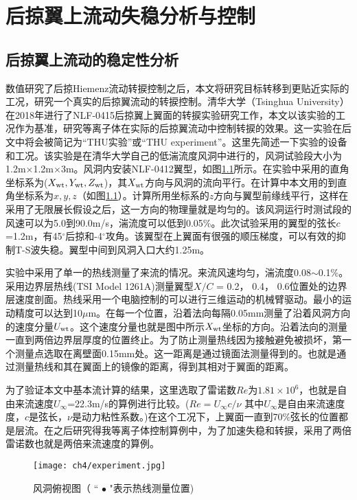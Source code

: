 \chapter{后掠翼上流动失稳分析与控制}
\section{后掠翼上流动的稳定性分析}
数值研究了后掠Hiemenz流动转捩控制之后，本文将研究目标转移到更贴近实际的工况，研究一个真实的后掠翼流动的转捩控制。清华大学（Tsinghua University）在2018年进行了NLF-0415后掠翼上翼面的转捩实验研究工作\cite{wang2018}，本文以该实验的工况作为基准，研究等离子体在实际的后掠翼流动中控制转捩的效果。这一实验在后文中将会被简记为``THU实验''或``THU experiment''。这里先简述一下实验的设备和工况。该实验是在清华大学自己的低湍流度风洞中进行的，风洞试验段大小为1.2m$\times$1.2m$\times$3m。风洞内安装NLF-0412翼型，如图\ref{f:experiment}所示。在实验中采用的直角坐标系为($X_{\rm wt},Y_{\rm wt},Z_{\rm wt}$)，其$X_{\rm wt}$方向与风洞的流向平行。在计算中本文用的到直角坐标系为$x,y,z$（如图\ref{f:experiment}）。计算所用坐标系的$z$方向与翼型前缘线平行，这样在采用了无限展长假设之后，这一方向的物理量就是均匀的。该风洞运行时测试段的风速可以为5.0到90.0m/s，湍流度可以低到0.05\%。此次试验采用的翼型的弦长$c$=1.2m，有45$^\circ$后掠和-4$^\circ$攻角。该翼型在上翼面有很强的顺压梯度，可以有效的抑制T-S波失稳\cite{Dagenhart1999}。翼型中间到风洞入口大约1.25m。

实验中采用了单一的热线测量了来流的情况。来流风速均匀，湍流度0.08$\sim$0.1\%。采用边界层热线(TSI Model 1261A)测量翼型$X/C$ = 0.2， 0.4， 0.6位置处的边界层速度剖面。热线采用一个电脑控制的可以进行三维运动的机械臂驱动。最小的运动精度可以达到10$\mu$m。在每一个位置，沿着法向每隔0.05mm测量了沿着风洞方向的速度分量$U_{\rm wt}$。这个速度分量也就是图中所示$X_{\rm wt}$坐标的方向。沿着法向的测量一直到两倍边界层厚度的位置终止。为了防止测量热线因为接触避免被损坏，第一个测量点选取在离壁面0.15mm处。这一距离是通过镜面法测量得到的。也就是通过测量热线和其在翼面上的镜像的距离，得到其相对于翼面的距离。

为了验证本文中基本流计算的结果，这里选取了雷诺数$Re$为$1.81\times10^6$，也就是自由来流速度$U_\infty$=22.3m/s的算例进行比较。($Re={U_\infty c}/{\nu}$ 其中$U_\infty$是自由来流速度度，$c$是弦长，$\nu$是动力粘性系数。)在这个工况下，上翼面一直到70\%弦长的位置都是层流。在之后研究得我等离子体控制算例中，为了加速失稳和转捩，采用了两倍雷诺数也就是两倍来流速度的算例。

\begin{figure}
  \centering
  \texttt{[image: ch4/experiment.jpg]}
  \caption{风洞俯视图（ `` $\bullet$ "表示热线测量位置)}\label{f:experiment}
\end{figure}

